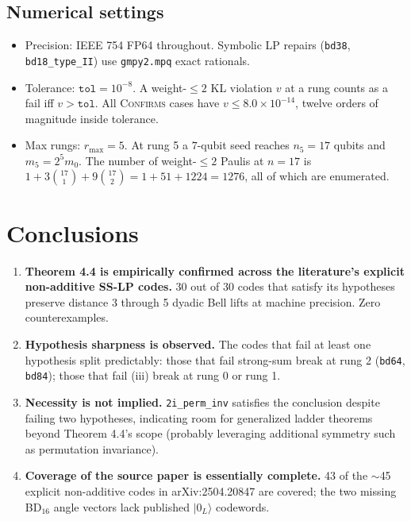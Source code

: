 \documentclass[11pt]{article}
\newcommand{\vCONF}{\textcolor{cConfirm}{\textsc{Confirms}}}
\newcommand{\enot}[2]{\ensuremath{#1\!\times\!10^{#2}}}
\begin{document}
\subsection{Numerical settings}

\begin{itemize}[leftmargin=2em]
\item Precision: IEEE 754 FP64 throughout. Symbolic LP repairs
(\texttt{bd38}, \texttt{bd18\_type\_II}) use \texttt{gmpy2.mpq} exact rationals.
\item Tolerance: $\mathtt{tol} = 10^{-8}$. A weight-$\le 2$ KL violation $v$ at
a rung counts as a fail iff $v > \mathtt{tol}$. All \vCONF{} cases have
$v \le \enot{8.0}{-14}$, twelve orders of magnitude inside tolerance.
\item Max rungs: $r_{\max} = 5$. At rung 5 a $7$-qubit seed reaches
$n_5 = 17$ qubits and $m_5 = 2^5 m_0$. The number of weight-$\le 2$ Paulis at
$n=17$ is $1 + 3\binom{17}{1} + 9\binom{17}{2} = 1 + 51 + 1224 = 1276$, all of
which are enumerated.
\end{itemize}

\section{Conclusions}
\label{sec:conclusions}

\begin{enumerate}[leftmargin=2em]
\item \textbf{Theorem 4.4 is empirically confirmed across the literature's
explicit non-additive SS-LP codes.} 30 out of 30 codes that satisfy its
hypotheses preserve distance 3 through 5 dyadic Bell lifts at machine
precision. Zero counterexamples.
\item \textbf{Hypothesis sharpness is observed.} The codes that fail at least
one hypothesis split predictably: those that fail strong-sum break at
rung 2 (\texttt{bd64}, \texttt{bd84}); those that fail (iii) break at
rung 0 or rung 1.
\item \textbf{Necessity is not implied.} \texttt{2i\_perm\_inv} satisfies the
conclusion despite failing two hypotheses, indicating room for generalized
ladder theorems beyond Theorem 4.4's scope (probably leveraging additional
symmetry such as permutation invariance).
\item \textbf{Coverage of the source paper is essentially complete.} 43 of the
$\sim$45 explicit non-additive codes in arXiv:2504.20847 are covered; the
two missing BD$_{16}$ angle vectors lack published $|0_L\rangle$ codewords.
\end{enumerate}
\end{document}
